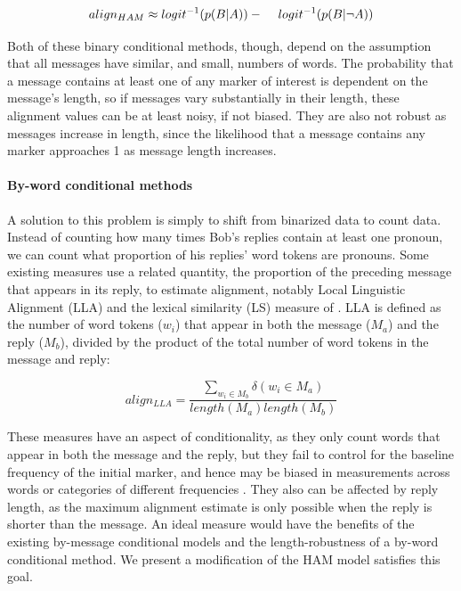 \documentclass[11pt]{article}
\begin{document}
\begin{dmath}
align_{HAM} \approx logit^{-1}(p(B|A)) - \\ \hspace*{1.2em} logit^{-1}(p(B|\neg A))
\end{dmath}

Both of these binary conditional methods, though, depend on the assumption that all messages have similar, and small, numbers of words. The probability that a message contains at least one of any marker of interest is dependent on the message's length, so if messages vary substantially in their length, these alignment values can be at least noisy, if not biased. They are also not robust as messages increase in length, since the likelihood that a message contains any marker approaches 1 as message length increases.

\paragraph{By-word conditional methods} A solution to this problem is simply to shift from binarized data to count data. Instead of counting how many times Bob's replies contain at least one pronoun, we can count what proportion of his replies' word tokens are pronouns.  Some existing measures use a related quantity, the proportion of the preceding message that appears in its reply, to estimate alignment, notably Local Linguistic Alignment (LLA) \cite{FusaroliEtAl2012,WangReitterYen2014} and the lexical similarity (LS) measure of \cite{HealeyPurverHowes2014}. LLA is defined as the number of word tokens ($w_i$) that appear in both the message ($M_a$) and the reply ($M_b$), divided by the product of the total number of word tokens in the message and reply:\vspace*{-5pt}

\begin{equation}
align_{LLA} = \frac{\sum_{w_i \in M_b} \delta(w_i \in M_a)}{length(M_a)length(M_b)}
\end{equation}

These measures have an aspect of conditionality, as they only count words that appear in both the message and the reply, but they fail to control for the baseline frequency of the initial marker, and hence may be biased in measurements across words or categories of different frequencies \cite{DoyleYurovskyFrank2016}. They also can be affected by reply length, as the maximum alignment estimate is only possible when the reply is shorter than the message.
An ideal measure would have the benefits of the existing by-message conditional models and the length-robustness of a by-word conditional method. We present a modification of the HAM model satisfies this goal.
\end{document}
